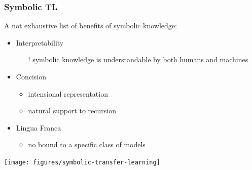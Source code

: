 \documentclass[presentation]{beamer}\mode<presentation>{\usetheme{blackAMSBolognaFC}}
\begin{document}
\begin{frame}[allowframebreaks]
\frametitle{Symbolic TL}

    A not exhaustive list of benefits of \alert{symbolic} knowledge:
    \vspace{0.5cm}
    \begin{itemize}
        \item Interpretability
        \begin{itemize}
            \item[!] symbolic knowledge is understandable by both humans and machines
        \end{itemize}

        \vfill

        \item Concision
        \begin{itemize}
            \item intensional representation
            \item natural support to recursion
        \end{itemize}

        \vfill

        \item Lingua Franca
        \begin{itemize}
            \item no bound to a specific class of models
        \end{itemize}

        \vfill

    \end{itemize}

    \framebreak

    \centering
    \texttt{[image: figures/symbolic-transfer-learning]}

\end{frame}
\end{document}
